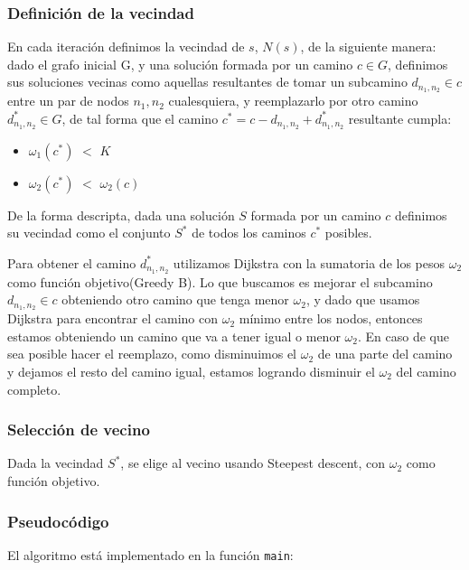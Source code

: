 \subsubsection{Definición de la vecindad}

En cada iteración definimos la vecindad de $s$, $N(s)$, de la siguiente manera: dado el grafo inicial G, y una solución formada por un camino $c \in G$, definimos sus soluciones vecinas como aquellas resultantes de tomar un subcamino $d_{n_1,n_2} \in c$ entre un par de nodos $n_1,n_2$ cualesquiera, y reemplazarlo por otro camino $d_{n_1,n_2}^* \in G$, de tal forma que el camino $c^* = c - d_{n_1,n_2} + d_{n_1,n_2}^*$ resultante cumpla: 

\begin{itemize}
\item $\omega_1(c^*)$ $<$ $K$
\item $\omega_2(c^*)$ $<$ $\omega_2(c)$
\end{itemize}

De la forma descripta, dada una solución $S$ formada por un camino $c$ definimos su vecindad como el conjunto $S^*$ de todos los caminos $c^*$ posibles.

Para obtener el camino $d_{n_1,n_2}^*$ utilizamos Dijkstra con la sumatoria de los pesos $\omega_2$ como función objetivo(Greedy B). Lo que buscamos es mejorar el subcamino $d_{n_1,n_2} \in c$ obteniendo otro camino que tenga menor $\omega_2$, y dado que usamos Dijkstra para encontrar el camino con $\omega_2$ mínimo entre los nodos, entonces estamos obteniendo un camino que va a tener igual o menor $\omega_2$. En caso de que sea posible hacer el reemplazo, como disminuimos el $\omega_2$ de una parte del camino y dejamos el resto del camino igual, estamos logrando disminuir el $\omega_2$ del camino completo.

\subsubsection{Selección de vecino}

Dada la vecindad $S^*$, se elige al vecino usando Steepest descent, con $\omega_2$ como función objetivo.

\subsubsection{Pseudocódigo}

El algoritmo está implementado en la función \texttt{main}:

